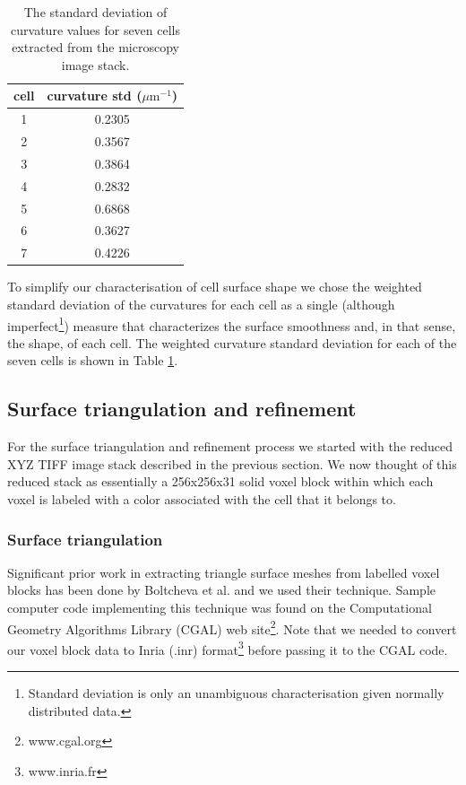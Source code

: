 \documentclass[a4paper,10pt]{article}
\begin{document}
\begin{table}[H]
\begin{center}
\footnotesize
\begin{tabular}{|c|c|}
\hline
cell &curvature std ($\mu \text{m}^{-1}$) \\
\hline
1 &0.2305\\
2 &0.3567\\
3 & 0.3864\\
4 &0.2832\\
5 &0.6868\\
6 &0.3627\\
7 & 0.4226\\
\hline
\end{tabular}
\end{center}
\caption{The standard deviation of curvature values for seven cells extracted from the microscopy image stack.}
\label{tab:ref_curv}
\end{table}

To simplify our characterisation of cell surface shape we chose the weighted standard deviation of the curvatures for each cell as a single (although imperfect\footnote{Standard deviation is only an unambiguous characterisation given normally distributed data.}) measure that characterizes the surface smoothness and, in that sense, the shape, of each cell. The weighted curvature standard deviation for each of the seven cells is shown in Table \ref{tab:ref_curv}.\\ 

\subsection{Surface triangulation and refinement}

For the surface triangulation and refinement process we started with the reduced XYZ TIFF image stack described in the previous section. We now thought of this reduced stack as essentially a 256x256x31 solid voxel block within which each voxel is labeled with a color associated with the cell that it belongs to. 

\subsubsection{Surface triangulation}

Significant prior work in extracting triangle surface meshes from labelled voxel blocks has been done by Boltcheva et al.\cite{boltcheva:inria-00420228} and we used their technique. Sample computer code implementing this technique was found on the Computational Geometry Algorithms Library (CGAL) web site\footnote{www.cgal.org}. Note that we needed to convert our voxel block data to Inria (.inr) format\footnote{www.inria.fr} before passing it to the CGAL code.
\end{document}
